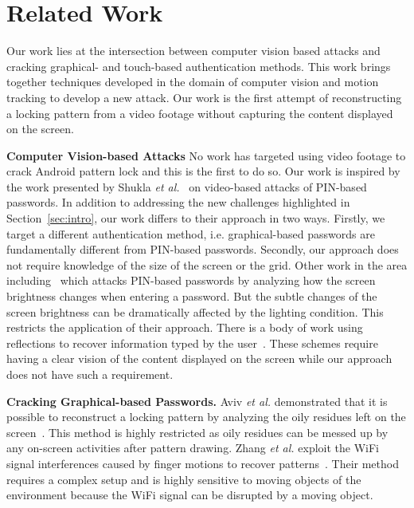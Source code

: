 \section{Related Work}
\label{section: relate-work}
Our work lies at the intersection between computer vision based attacks and
cracking graphical- and touch-based authentication methods. This work brings
together techniques developed in the domain of computer vision and motion
tracking to develop a new attack. Our work is the first attempt
of reconstructing a locking pattern from a video footage without
capturing the content displayed on the screen.

\vspace{2mm}
\noindent \textbf{Computer Vision-based Attacks} No work has targeted using video
footage to crack Android pattern lock and this is the first to do so. Our work is inspired by the work
presented by Shukla \emph{et al.}~\cite{shukla2014beware} on video-based attacks of
PIN-based passwords. In addition to addressing the new challenges highlighted in Section~\ref{sec:intro}, our work differs to their approach in
two ways.
Firstly, we target a different authentication method, i.e. graphical-based passwords are fundamentally different from PIN-based passwords. %
Secondly, our approach does not require knowledge of the size of the screen or the grid.
Other work in the area including~\cite{yue2014blind} which attacks PIN-based passwords by analyzing how the screen brightness changes when entering a password.
But the subtle changes of the screen brightness can be dramatically affected by the lighting condition. This restricts the application of their approach.
There is a body of work using reflections to recover information typed by the user~\cite{kuhn2002compromising,xu2013seeing,raguram2011ispy,backes2009tempest}. These schemes require having a clear vision of the content displayed on the screen while our approach does not have such a requirement.

\vspace{2mm}
\noindent \textbf{Cracking Graphical-based Passwords.}
Aviv \emph{et al.} demonstrated that it is possible to reconstruct a locking pattern by analyzing the oily residues left on the screen~\cite{aviv2010smudge}.
 This method is highly restricted as oily residues can be messed up by any on-screen activities after pattern drawing.
Zhang \emph{et al.} exploit the WiFi signal interferences caused by finger motions to recover patterns~\cite{zhang2016privacy}. Their method requires a complex setup and is highly sensitive to moving objects of the environment
because the WiFi signal can be disrupted by a moving object.


